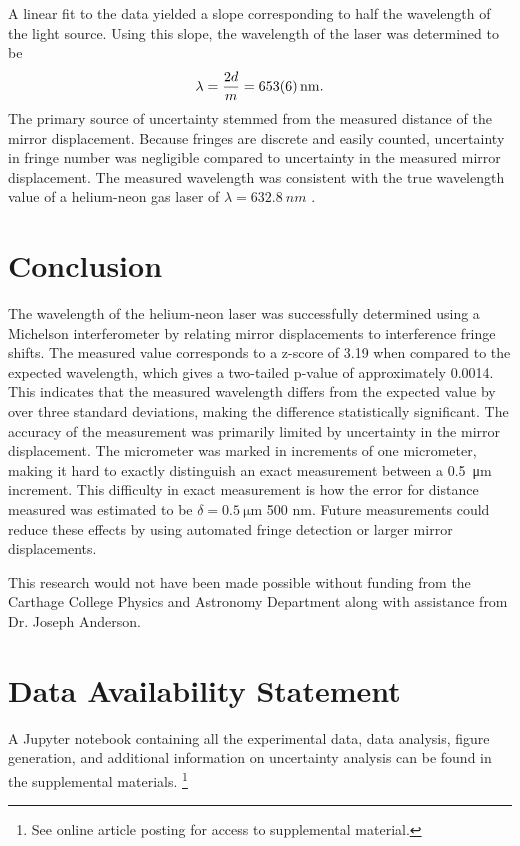 \documentclass[rc]{physicsinprogress}
\begin{document}
A linear fit to the data yielded a slope corresponding to half the wavelength of the light source. Using this slope, the wavelength of the laser was determined to be 
\begin{equation}
\lambda = \frac{2d}{m} = \SI{653 \pm 6}{\nm}.
\end{equation}
The primary source of uncertainty stemmed from the measured distance of the mirror displacement. Because fringes are discrete and easily counted, uncertainty in fringe number was negligible compared to uncertainty in the measured mirror displacement. The measured wavelength was consistent with the true wavelength value of a helium-neon gas laser of $\lambda = \SI{632.8}{nm}$ \cite{pasco_mini_laser}.

\section{Conclusion}
The wavelength of the helium-neon laser was successfully determined using a Michelson interferometer by relating mirror displacements to interference fringe shifts. The measured value corresponds to a z-score of 3.19 when compared to the expected wavelength, which gives a two-tailed p-value of approximately 0.0014. This indicates that the measured wavelength differs from the expected value by over three standard deviations, making the difference statistically significant. The accuracy of the measurement was primarily limited by uncertainty in the mirror displacement. The micrometer was marked in increments of one micrometer, making it hard to exactly distinguish an exact measurement between a \SI{0.5}{\micro\metre} increment. This difficulty in exact measurement is how the error for distance measured was estimated to be $\delta = \SI{0.5}{\micro\metre}$ \= 500 nm. Future measurements could reduce these effects by using automated fringe detection or larger mirror displacements. 

\begin{acknowledgments}
This research would not have been made possible without funding from the Carthage College Physics and Astronomy Department along with assistance from Dr. Joseph Anderson.
\end{acknowledgments}

\section*{Data Availability Statement}
A Jupyter notebook containing all the experimental data, data analysis, figure generation, and additional information on uncertainty analysis can be found in the supplemental materials. \footnote{See online article posting for access to supplemental material.}


\end{document}
